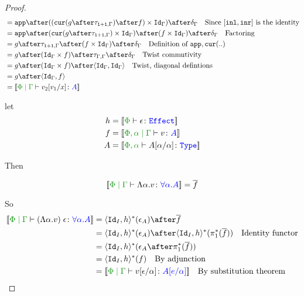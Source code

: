 \documentclass{report}
\begin{document}
\begin{framed}
\begin{proof}
{{\begin{align*}
                & = \app\after((\cur{g\after\twist{\1+\1}{\G}}\after f)\times \idg)\after\diag{\G}\qt{Since $\fld{\inl}{\inr}$ is the identity}\\
                & = \app\after(\cur{g\after\twist{\1+\1}{\G}}\times \idg)\after (f\times \idg)\after\diag{\G}\qt{Factoring}\\
               & = g\after\twist{\1+\1}{\G} \after (f\times \idg)\after\diag{\G} \qt{Definition of $\app,\cur{..}$}\\
               & = g\after(\idg\times f)\after \twist{\G}{\G} \after\diag{\G} \qt{Twist commutivity}\\
               & = g\after(\idg\times f) \after\pr{\idg}{\idg} \qt{Twist, diagonal defintions} \\
               & = g\after\pr{\idg}{f} \\
               & = \deno{\gpetyperelation{v_2\ssub{x}{v_1}}{A}} \\
            \end{align*}
            }}
        
            \case{\eqeffbeta}
            let 
            \begin{align*}
                h & = \deno{\typerelation{\P}{\e}{\effect}}
                \\
                f & = \deno{\etyperelation{\P,\a}{\G}{v}{A}}
                \\
                A &= \deno{\typerelation{\P,\a}{A\ssub{\a}{\a}}{\type}}
            \end{align*}
        
            Then
        
            \begin{equation}
                \deno{\gpetyperelation{\elam{\a}{v}}{\all{\a}{A}}} = \bar{f}\\
            \end{equation}
        
            So
            \begin{align*}
                \deno{\gpetyperelation{\eapp{(\elam{\a}{v})}{\e}}{\all{\a}{A}}} & = \pr{\Id{I}}{h}\star(\e_A)\after\bar{f}\\
                & = \pr{\Id{I}}{h}\star(\e_A)\after\pr{\Id{I}}{h}\star(\pstar(\bar{f}))\qt{Identity functor}\\
                &= \pr{\Id{I}}{h}\star(\e_A\after\pstar(\bar{f}))\\
                &= \pr{\Id{I}}{h}\star(f)\qt{By adjunction}\\
                &= \deno{\gpetyperelation{v\ssub{\a}{\e}}{A\ssub{\a}{e}}}\qt{By substitution theorem}\\
            \end{align*}
        

\end{proof}
\end{framed}
\end{document}
